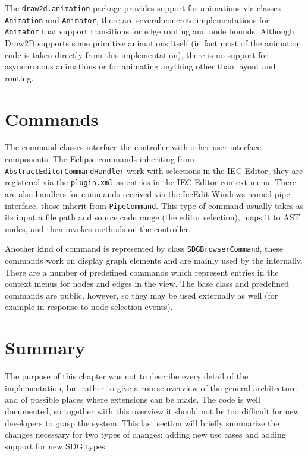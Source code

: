 The \lstinline|draw2d.animation| package provides support for animations via classes \lstinline|Animation| and 
\lstinline|Animator|, there are several concrete implementations for \lstinline|Animator| that support transitions for 
edge routing and node bounds. Although Draw2D supports some primitive animations itself (in fact most of the animation 
code is taken directly from this implementation), there is no support for asynchronous animations or for animating 
anything other than layout and routing.


\section{Commands}

The command classes interface the \SB controller with other user interface components. The Eclipse commands inheriting 
from \lstinline|AbstractEditorCommandHandler| work with selections in the IEC Editor, they are registered via the \SB 
\lstinline|plugin.xml| as entries in the IEC Editor context menu. There are also handlers for commands received via the 
IecEdit Windows named pipe interface, those inherit from \lstinline|PipeCommand|. This type of command usually takes as 
its input a file path and source code range (the editor selection), maps it to AST nodes, and then invokes methods on 
the \SB controller.

Another kind of command is represented by class \lstinline|SDGBrowserCommand|, these commands work on display graph 
elements and are mainly used by the \SB internally. There are a number of predefined commands which represent entries 
in the context menus for nodes and edges in the \SB view. The base class and predefined commands are public, however, 
so they may be used externally as well (for example in response to node selection events).


\section{Summary}

The purpose of this chapter was not to describe every detail of the implementation, but rather to give a course 
overview of the general architecture and of possible places where extensions can be made. The code is well documented, 
so together with this overview it should not be too difficult for new developers to grasp the system. This last section 
will briefly summarize the changes necessary for two types of changes: adding new use cases and adding support for new 
SDG types.

